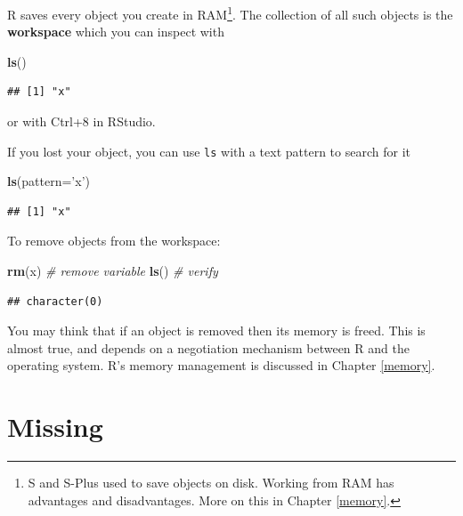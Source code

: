 \documentclass[]{book}
\newenvironment{Shaded}{\begin{snugshade}}{\end{snugshade}}
\newcommand{\KeywordTok}[1]{\textcolor[rgb]{0.13,0.29,0.53}{\textbf{#1}}}
\newcommand{\DataTypeTok}[1]{\textcolor[rgb]{0.13,0.29,0.53}{#1}}
\newcommand{\StringTok}[1]{\textcolor[rgb]{0.31,0.60,0.02}{#1}}
\newcommand{\CommentTok}[1]{\textcolor[rgb]{0.56,0.35,0.01}{\textit{#1}}}
\newcommand{\NormalTok}[1]{#1}
\theoremstyle{definition}
\theoremstyle{definition}
\theoremstyle{definition}
\theoremstyle{remark}
\begin{document}
R saves every object you create in RAM\footnote{S and S-Plus used to
  save objects on disk. Working from RAM has advantages and
  disadvantages. More on this in Chapter \ref{memory}.}. The collection
of all such objects is the \textbf{workspace} which you can inspect with

\begin{Shaded}
\begin{Highlighting}[]
\KeywordTok{ls}\NormalTok{()}
\end{Highlighting}
\end{Shaded}

\begin{verbatim}
## [1] "x"
\end{verbatim}

or with Ctrl+8 in RStudio.

If you lost your object, you can use \texttt{ls} with a text pattern to
search for it

\begin{Shaded}
\begin{Highlighting}[]
\KeywordTok{ls}\NormalTok{(}\DataTypeTok{pattern=}\StringTok{'x'}\NormalTok{)}
\end{Highlighting}
\end{Shaded}

\begin{verbatim}
## [1] "x"
\end{verbatim}

To remove objects from the workspace:

\begin{Shaded}
\begin{Highlighting}[]
\KeywordTok{rm}\NormalTok{(x) }\CommentTok{# remove variable}
\KeywordTok{ls}\NormalTok{() }\CommentTok{# verify}
\end{Highlighting}
\end{Shaded}

\begin{verbatim}
## character(0)
\end{verbatim}

You may think that if an object is removed then its memory is freed.
This is almost true, and depends on a negotiation mechanism between R
and the operating system. R's memory management is discussed in Chapter
\ref{memory}.

\section{Missing}\label{missing}
\end{document}
